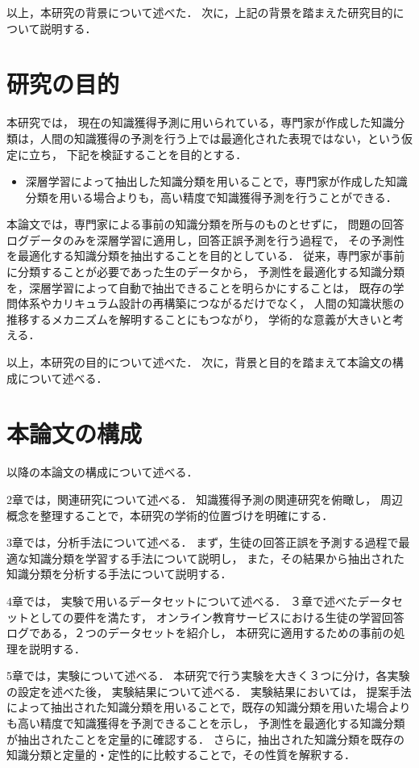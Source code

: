 \vvspace
以上，本研究の背景について述べた．
次に，上記の背景を踏まえた研究目的について説明する．

\section{研究の目的}
本研究では，
現在の知識獲得予測に用いられている，専門家が作成した知識分類は，人間の知識獲得の予測を行う上では最適化された表現ではない，という仮定に立ち，
下記を検証することを目的とする．
\begin{itemize}
\item 深層学習によって抽出した知識分類を用いることで，専門家が作成した知識分類を用いる場合よりも，高い精度で知識獲得予測を行うことができる．
\end{itemize}

本論文では，専門家による事前の知識分類を所与のものとせずに，
問題の回答ログデータのみを深層学習に適用し，回答正誤予測を行う過程で，
その予測性を最適化する知識分類を抽出することを目的としている．
従来，専門家が事前に分類することが必要であった生のデータから，
予測性を最適化する知識分類を，深層学習によって自動で抽出できることを明らかにすることは，
既存の学問体系やカリキュラム設計の再構築につながるだけでなく，
人間の知識状態の推移するメカニズムを解明することにもつながり，
学術的な意義が大きいと考える．


\vvspace
以上，本研究の目的について述べた．
次に，背景と目的を踏まえて本論文の構成について述べる．



\section{本論文の構成}
以降の本論文の構成について述べる．


2章では，関連研究について述べる．
知識獲得予測の関連研究を俯瞰し，
周辺概念を整理することで，本研究の学術的位置づけを明確にする．


3章では，分析手法について述べる．
まず，生徒の回答正誤を予測する過程で最適な知識分類を学習する手法について説明し，
また，その結果から抽出された知識分類を分析する手法について説明する．


4章では，
実験で用いるデータセットについて述べる．
３章で述べたデータセットとしての要件を満たす，
オンライン教育サービスにおける生徒の学習回答ログである，２つのデータセットを紹介し，
本研究に適用するための事前の処理を説明する．


5章では，実験について述べる．
本研究で行う実験を大きく３つに分け，各実験の設定を述べた後，
実験結果について述べる．
実験結果においては，
提案手法によって抽出された知識分類を用いることで，既存の知識分類を用いた場合よりも高い精度で知識獲得を予測できることを示し，
予測性を最適化する知識分類が抽出されたことを定量的に確認する．
さらに，抽出された知識分類を既存の知識分類と定量的・定性的に比較することで，その性質を解釈する．


